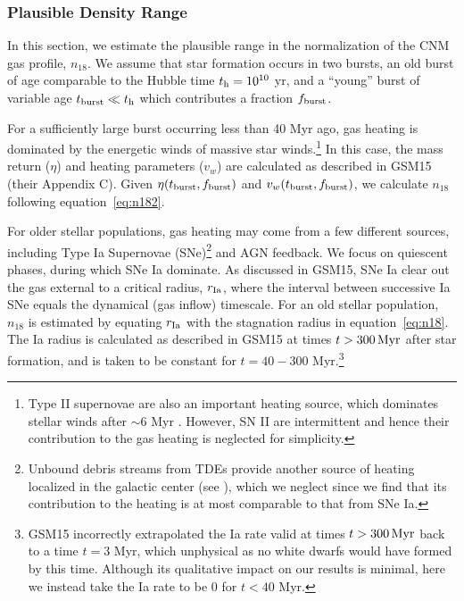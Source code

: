 \documentclass[usenatbib,fleqn]{mnras}
\begin{document}
\subsubsection{Plausible Density Range}
\label{sec:densAllowed}

In this section, we estimate the plausible range in the normalization
of the CNM gas profile, $n_{18}$.  We assume that star formation
occurs in two bursts, an old burst of age comparable to the Hubble
time $t_{\rm h} = 10^{10}$ yr, and a ``young'' burst of variable age
$t_{\rm burst} \ll t_{\rm h}$ which contributes a fraction $f_{\rm
  burst}$.

For a sufficiently large burst occurring less than 40 Myr ago, gas
heating is dominated by the energetic winds of massive star
winds.\footnote{Type II supernovae are also an important heating
  source, which dominates stellar winds after $\sim$6 Myr
  \citep{Voss+2009}.  However, SN II are intermittent and hence their
  contribution to the gas heating is neglected for simplicity.}  In
this case, the mass return ($\eta$) and heating parameters ($v_w$) are
calculated as described in GSM15 (their Appendix C).  Given
$\eta(t_{\rm burst},f_{\rm burst})$ and $v_w(t_{\rm burst},f_{\rm
  burst})$, we calculate $n_{18}$ following equation~\eqref{eq:n182}.

For older stellar populations, gas heating may come from a few
different sources, including Type Ia Supernovae (SNe)\footnote{Unbound
  debris streams from TDEs provide another source of heating localized
  in the galactic center (see \citep{Guillochon+2015a}), which we
  neglect since we find that its contribution to the heating is at
  most comparable to that from SNe Ia.} and AGN feedback.  We focus on
quiescent phases, during which SNe Ia dominate.  As discussed in
GSM15, SNe Ia clear out the gas external to a critical radius, $r_{\rm
  Ia}$, where the interval between successive Ia SNe equals the
dynamical (gas inflow) timescale.  For an old stellar population,
$n_{18}$ is estimated by equating $r_{\rm Ia}$ with the stagnation
radius in equation~\eqref{eq:n18}.  The Ia radius is calculated as
described in GSM15 at times $t>300 \,{\rm Myr}$ after star formation,
and is taken to be constant for $t = 40-300$ Myr.\footnote{GSM15
  incorrectly extrapolated the Ia rate valid at times $t>300 \,{\rm
    Myr}$ back to a time $t = 3$ Myr, which unphysical as no white
  dwarfs would have formed by this time.  Although its qualitative
  impact on our results is minimal, here we instead take the Ia rate
  to be 0 for $ t < 40$ Myr.}
\end{document}
